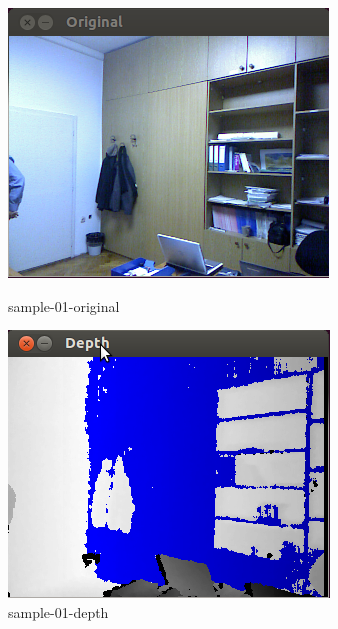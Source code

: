 \begin{figure}
\centering
\begin{minipage}{.5\textwidth}
  \centering
  \includegraphics[width=.9\linewidth]{images/lab6-sample-01-or.png}
  \caption{sample-01-original}
  \label{fig:sample-01-original}
\end{minipage}%
\begin{minipage}{.5\textwidth}
  \centering
  \includegraphics[width=.9\linewidth]{images/lab6-sample-01-dp.png}
  \caption{sample-01-depth}
  \label{fig:sample-01-depth}
\end{minipage}
\end{figure}

